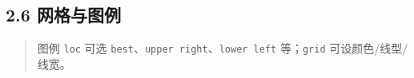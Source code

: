 \begin{Shaded}
\begin{Highlighting}[]
\end{Highlighting}
\end{Shaded}

\subsection{2.6 网格与图例}\label{ux7f51ux683cux4e0eux56feux4f8b}

\begin{Shaded}
\begin{Highlighting}[]

\OperatorTok{=}
\NormalTok{ax.plot([}\NormalTok{, }\NormalTok{, }\NormalTok{], [}\NormalTok{, }\NormalTok{, }\NormalTok{], label}\OperatorTok{=}\NormalTok{)}
\NormalTok{ax.plot([}\NormalTok{, }\NormalTok{, }\NormalTok{], [}\NormalTok{, }\NormalTok{, }\NormalTok{], label}\OperatorTok{=}\NormalTok{)}
\OperatorTok{=}\OperatorTok{=}\StringTok{\textquotesingle{}{-}{-}\textquotesingle{}}\OperatorTok{=}\NormalTok{)}
\NormalTok{(}\NormalTok{, }
\end{Highlighting}
\end{Shaded}

\begin{Shaded}
\begin{Highlighting}[]
\end{Highlighting}
\end{Shaded}

\begin{quote}
图例 \texttt{loc} 可选
\texttt{\textquotesingle{}best\textquotesingle{}}、\texttt{\textquotesingle{}upper\ right\textquotesingle{}}、\texttt{\textquotesingle{}lower\ left\textquotesingle{}}
等；\texttt{grid} 可设颜色/线型/线宽。
\end{quote}

